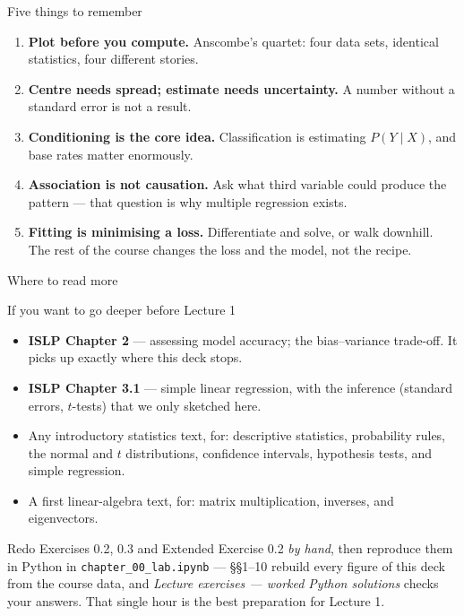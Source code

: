 \documentclass[aspectratio=169,11pt]{beamer}
\begin{document}
\begin{frame}{Five things to remember}
  \begin{enumerate}
    \item \textbf{Plot before you compute.} Anscombe's quartet: four data
          sets, identical statistics, four different stories.
    \item \textbf{Centre needs spread; estimate needs uncertainty.} A number
          without a standard error is not a result.
    \item \textbf{Conditioning is the core idea.} Classification is
          estimating $P(Y \mid X)$, and base rates matter enormously.
    \item \textbf{Association is not causation.} Ask what third variable
          could produce the pattern --- that question is why multiple
          regression exists.
    \item \textbf{Fitting is minimising a loss.} Differentiate and solve, or
          walk downhill. The rest of the course changes the loss and the
          model, not the recipe.
  \end{enumerate}
\end{frame}

\begin{frame}{Where to read more}
  \footnotesize
  \begin{block}{If you want to go deeper before Lecture 1}
    \begin{itemize}
      \item \textbf{ISLP Chapter 2} --- assessing model accuracy; the
            bias--variance trade-off. It picks up exactly where this deck
            stops.
      \item \textbf{ISLP Chapter 3.1} --- simple linear regression, with the
            inference (standard errors, $t$-tests) that we only sketched here.
      \item Any introductory statistics text, for: descriptive statistics,
            probability rules, the normal and $t$ distributions, confidence
            intervals, hypothesis tests, and simple regression.
      \item A first linear-algebra text, for: matrix multiplication,
            inverses, and eigenvectors.
    \end{itemize}
  \end{block}
  \begin{labnote}
    Redo Exercises 0.2, 0.3 and Extended Exercise 0.2 \emph{by hand}, then
    reproduce them in Python in \texttt{chapter\_00\_lab.ipynb}
    --- \S\S1--10 rebuild every figure of this deck from the course data, and
    \emph{Lecture exercises --- worked Python solutions} checks your answers. That single hour is the best
    preparation for Lecture 1.
  \end{labnote}
\end{frame}
\end{document}

